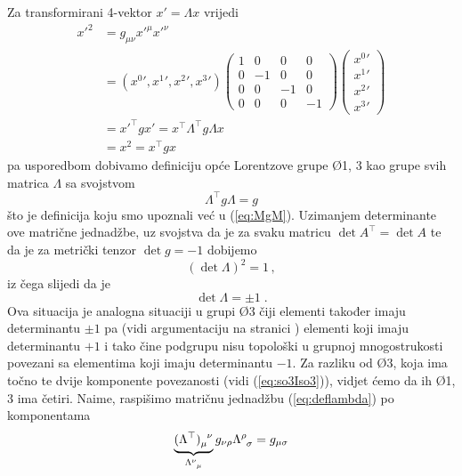 Za transformirani 4-vektor $x' = \Lambda x$ vrijedi
\begin{align}
 {x'}^2 &= g_{\mu\nu} {x'}^\mu {x'}^\nu \\
        &= ({x^0}', {x^1}', {x^2}', {x^3}')
\begin{pmatrix}
1 & 0 & 0 & 0 \\
0 &-1 & 0 & 0 \\
0 & 0 &-1 & 0 \\
0 & 0 & 0 &-1
\end{pmatrix}
\begin{pmatrix}
{x^0}' \\ {x^1}' \\ {x^2}' \\ {x^3}'
\end{pmatrix} \\
  &= {x'}^{\top} g x' = x^\top \Lambda^\top g \Lambda x \\
  &= x^2 = x^\top g x
\end{align}
pa usporedbom dobivamo definiciju opće Lorentzove grupe
\O{1, 3}
kao grupe svih matrica $\Lambda$ sa svojstvom
\begin{equation}
   \Lambda^\top g \Lambda = g
\label{deflambda}
\end{equation}
što je definicija koju smo upoznali već u (\ref{eq:MgM}).
Uzimanjem determinante ove matrične jednadžbe, uz svojstva
da je za svaku matricu $\det A^\top = \det A$ te da je za
metrički tenzor $\det g = -1$ dobijemo 
\begin{equation}
   (\det \Lambda)^2 = 1 \,,
\end{equation}
iz čega slijedi da je
\begin{equation}
   \det\Lambda = \pm 1 \;.
\label{detL}
\end{equation}
Ova situacija je analogna situaciji u grupi \O{3} čiji elementi
također imaju determinantu $\pm 1$ pa (vidi argumentaciju na
stranici \pageref{eq:povezanostO3}) elementi koji imaju
determinantu $+1$ i tako čine podgrupu  nisu topološki
u grupnoj mnogostrukosti povezani sa elementima koji imaju
determinantu $-1$. Za razliku od \O{3}, koja ima točno te
dvije komponente povezanosti (vidi (\ref{eq:so3Iso3})), 
vidjet ćemo da ih \O{1, 3} ima četiri.
Naime, raspišimo matričnu jednadžbu (\ref{eq:deflambda})  po komponentama
\begin{equation}
    \underbrace{\tensor{(\Lambda^\top)}{_{\mu}^{\nu}}}_{\tensor{\Lambda}{^{\nu}_{\mu}}}
    g_{\nu\rho}\tensor{\Lambda}{^{\rho}_{\sigma}} = g_{\mu\sigma}
\end{equation}

